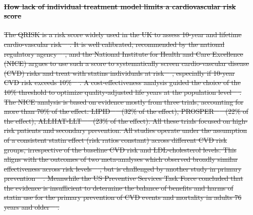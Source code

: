 \documentclass[10pt,letterpaper]{article}
\providecommand{\DIFdeltex}[1]{{\protect\color{red}\sout{#1}}}                      %
\providecommand{\DIFdelbegin}{} %
\providecommand{\DIFdelend}{} %
\providecommand{\DIFdel}[1]{\texorpdfstring{\DIFdeltex{#1}}{}} %
\newcommand{\DIFscaledelfig}{0.5}
\newlength{\DIFdelgraphicswidth} %
\newlength{\DIFdelgraphicsheight} %
\newcommand{\DIFdelincludegraphics}[2][]{%
\sbox{\DIFdelgraphicsbox}{\DIFOincludegraphics[#1]{#2}}%
\settoboxwidth{\DIFdelgraphicswidth}{\DIFdelgraphicsbox} %
\settoboxtotalheight{\DIFdelgraphicsheight}{\DIFdelgraphicsbox} %
\scalebox{\DIFscaledelfig}{%
\parbox[b]{\DIFdelgraphicswidth}{\usebox{\DIFdelgraphicsbox}\\[-\baselineskip] \rule{\DIFdelgraphicswidth}{0em}}\llap{\resizebox{\DIFdelgraphicswidth}{\DIFdelgraphicsheight}{%
\setlength{\unitlength}{\DIFdelgraphicswidth}%
\begin{picture}(1,1)%
\thicklines\linethickness{2pt} %
{\color[rgb]{1,0,0}\put(0,0){\framebox(1,1){}}}%
{\color[rgb]{1,0,0}\put(0,0){\line( 1,1){1}}}%
{\color[rgb]{1,0,0}\put(0,1){\line(1,-1){1}}}%
\end{picture}%
}\hspace*{3pt}}} %
} %
\DeclareRobustCommand{\DIFdelbegin}{\DIFOdelbegin \let\includegraphics\DIFdelincludegraphics} %
\DeclareRobustCommand{\DIFdelend}{\DIFOaddend \let\includegraphics\DIFOincludegraphics} %
\begin{document}
\DIFdelbegin \paragraph{\DIFdel{How lack of individual treatment model limits a cardiovascular risk score}}
\addtocounter{paragraph}{-1}%
\DIFdel{The QRISK is a risk score widely used in the UK to assess 10-year and lifetime cardio-vascular risk \mbox{%
    \cite{hippisley2017development}}\hskip0pt%
  . It is well calibrated, recommended by the national regulatory agency \mbox{%
    \cite{guideline2023cardiovascular}}\hskip0pt%
  , and the National Institute for Health and Care Excellence (NICE) argues to use such a score to systematically screen cardio-vascular disease (CVD) risks and treat with statins individuals at risk \mbox{%
    \cite{guideline2023cardiovascular}}\hskip0pt%
  , especially if 10-year CVD risk exceeds 10\% \mbox{%
    \cite{rabar2014lipid}}\hskip0pt%
  .
  A cost-effectiveness analysis guided the choice of the 10\% threshold to optimize quality-adjusted life years at the population level \mbox{%
    \cite{guthrie2023competing}}\hskip0pt%
  . The NICE analysis is based on evidence mostly from three trials, accounting for more than 70\% of the effect: LIPID \mbox{%
    \cite{long1998prevention} }\hskip0pt%
  (32\% of the effect), PROSPER \mbox{%
    \cite{shepherd2002pravastatin} }\hskip0pt%
  (22\% of the effect), ALLHAT-LLT \mbox{%
    \cite{antihypertensive2002major} }\hskip0pt%
  (23\% of the effect). All these trials focused on high-risk patients and secondary prevention. All studies operate under the assumption of a consistent statin effect (risk ratios constant) across different CVD risk groups, irrespective of the baseline CVD risk and LDL-cholesterol levels. This aligns with the outcomes of two meta-analyses which observed broadly similar effectiveness across risk levels \mbox{%
    \cite{brugts2009benefits}}\hskip0pt%
  , but is challenged by another study in primary prevention \mbox{%
    \cite{byrne2019statins}}\hskip0pt%
  . Meanwhile the US Preventive Services Task Force concluded that the evidence is insufficient to determine the balance of benefits and harms of statin use for the primary prevention of CVD events and mortality in adults 76 years and older \mbox{%
    \cite{chou2022statin}}\hskip0pt%
  .
}\DIFdelend %
\end{document}
